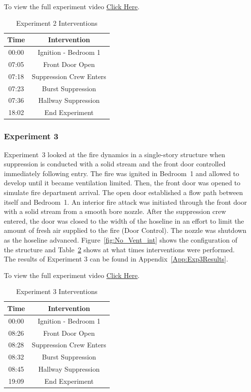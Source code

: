 \documentclass[12pt,oneside]{book}
\begin{document}
To view the full experiment video \href{https://player.vimeo.com/video/170510934?autoplay=1}{Click Here}.

\begin{table}[!ht]
	\centering
	\caption{Experiment 2 Interventions}
	\begin{tabular}{|c|c|} 
		\hline
		Time & Intervention \\ \hline \hline
		00:00 & Ignition - Bedroom 1 \\ \hline
		07:05 & Front Door Open \\ \hline
		07:18 & Suppression Crew Enters\\ \hline
		07:23 & Burst Suppression \\ \hline 
		07:36 & Hallway Suppression \\ \hline
		18:02 & End Experiment\\ \hline
	\end{tabular}
	\label{Table:Exp2Interventions}
\end{table}

\FloatBarrier

\subsubsection{Experiment 3}
Experiment~3 looked at the fire dynamics in a single-story structure when suppression is conducted with a solid stream and the front door controlled immediately following entry. The fire was ignited in Bedroom~1 and allowed to develop until it became ventilation limited. Then, the front door was opened to simulate fire department arrival. The open door established a flow path between itself and Bedroom~1. An interior fire attack was initiated through the front door with a solid stream from a smooth bore nozzle. After the suppression crew entered, the door was closed to the width of the hoseline in an effort to limit the amount of fresh air supplied to the fire (Door Control). The nozzle was shutdown as the hoseline advanced. Figure~\ref{fig:No_Vent_int} shows the configuration of the structure and Table~\ref{Table:Exp3Interventions} shows at what times interventions were performed. The results of Experiment 3 can be found in Appendix~\ref{App:Exp3Results}.

To view the full experiment video \href{https://player.vimeo.com/video/170513516?autoplay=1}{Click Here}.

\begin{table}[!ht]
	\centering
	\caption{Experiment 3 Interventions}
	\begin{tabular}{|c|c|} 
		\hline
		Time & Intervention \\ \hline \hline
		00:00 & Ignition - Bedroom 1 \\ \hline
		08:26 & Front Door Open \\ \hline
		08:28 & Suppression Crew Enters\\ \hline
		08:32 & Burst Suppression \\ \hline 
		08:45 & Hallway Suppression \\ \hline
		19:09 & End Experiment\\ \hline
	\end{tabular}
	\label{Table:Exp3Interventions}
\end{table}
\end{document}
